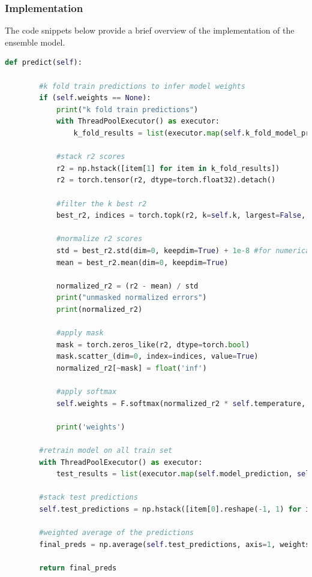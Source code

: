 \subsubsection{Implementation}
The code snippets below provide a brief overview of the implementation of the ensemble model.
\label{weighted average implementation}
\begin{lstlisting}[language=Python, caption=Stacking Implementation]
def predict(self):

        #k fold train predictions to infer model weights
        if (self.weights == None):
            print("k fold train predictions")
            with ThreadPoolExecutor() as executor:
                k_fold_results = list(executor.map(self.k_fold_model_prediction, self.trained_models)) 

            #stack r2 scores
            r2 = np.hstack([item[1] for item in k_fold_results])
            r2 = torch.tensor(r2, dtype=torch.float32).detach()

            #filter the k best r2
            best_r2, indices = torch.topk(r2, k=self.k, largest=False, sorted=False)

            #normalize r2 scores
            std = best_r2.std(dim=0, keepdim=True) + 1e-8 #for numerical stability (to avoid division by zero)
            mean = best_r2.mean(dim=0, keepdim=True)

            normalized_r2 = (r2 - mean) / std
            print("unmasked normalized errors")
            print(normalized_r2)

            #apply mask
            mask = torch.zeros_like(r2, dtype=torch.bool)
            mask.scatter_(dim=0, index=indices, value=True)
            normalized_r2[~mask] = float('inf')

            #apply softmax
            self.weights = F.softmax(normalized_r2 * self.temperature, dim=0)

            print('weights')

        #retrain model on all train set 
        with ThreadPoolExecutor() as executor: 
            test_results = list(executor.map(self.model_prediction, self.trained_models)) 

        #stack test predictions
        self.test_predictions = np.hstack([item[0].reshape(-1, 1) for item in test_results])

        #weighted average of the predictions
        final_preds = np.average(self.test_predictions, axis=1, weights=self.weights)

        return final_preds
\end{lstlisting}
